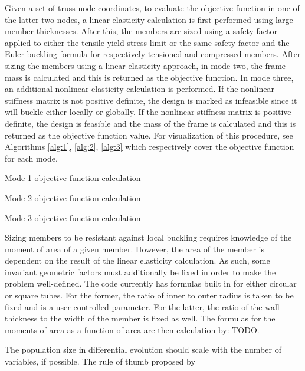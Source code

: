 \documentclass{report}
\begin{document}
Given a set of truss node coordinates, to evaluate the objective function in one of the latter two
nodes, a linear elasticity calculation is first performed using large member thicknesses. After this,
the members are sized using a safety factor applied to either the tensile yield stress limit or
the same safety factor and the Euler buckling formula for respectively tensioned and compressed members.
After sizing the members using a linear elasticity approach, in mode two, the frame mass is calculated
and this is returned as the objective function. In mode three, an additional nonlinear elasticity calculation
is performed. If the nonlinear stiffness matrix is not positive definite, the design is marked as infeasible
since it will buckle either locally or globally. If the nonlinear stiffness matrix is positive definite,
the design is feasible and the mass of the frame is calculated and this is returned as the objective
function value. For visualization of this procedure, see Algorithms \ref{alg:1}, \ref{alg:2}, \ref{alg:3}
which respectively cover the objective function for each mode.

\begin{algorithm}
  \caption{Mode 1 objective function calculation}
\end{algorithm}

\begin{algorithm}
  \caption{Mode 2 objective function calculation}
\end{algorithm}

\begin{algorithm}
  \caption{Mode 3 objective function calculation}
\end{algorithm}

Sizing members to be resistant against local buckling requires knowledge of the moment of area
of a given member. However, the area of the member is dependent on the result of the linear
elasticity calculation. As such, some invariant geometric factors must additionally be
fixed in order to make the problem well-defined. The code currently has formulas built
in for either circular or square tubes. For the former, the ratio of inner to outer radius
is taken to be fixed and is a user-controlled parameter. For the latter, the ratio of the
wall thickness to the width of the member is fixed as well. The formulas for the moments
of area as a function of area are then calculation by: TODO.

The population size in differential evolution should scale with the number of
variables, if possible. The rule of thumb proposed by \cite{piotrowskiReviewDifferentialEvolution2017}
\end{document}
